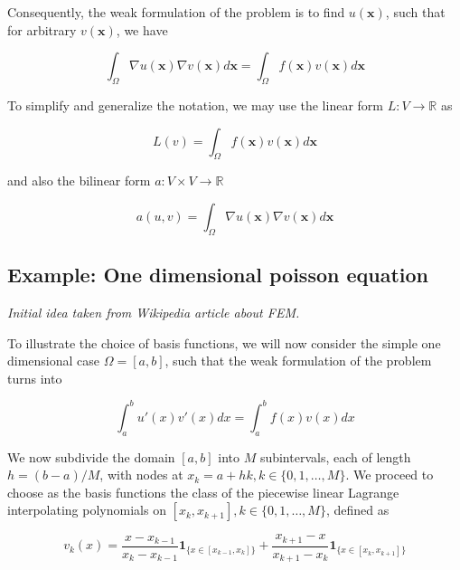 \documentclass[11pt, a4paper]{article}
\begin{document}
Consequently, the weak formulation of the problem is to find $u(\mathbf{x})$, such
that for arbitrary $v(\mathbf{x})$, we have

\begin{equation}
    \int_{\Omega} \nabla u(\mathbf{x}) \nabla v(\mathbf{x}) d\mathbf{x} = \int_{\Omega} f(\mathbf{x}) v(\mathbf{x}) d\mathbf{x}
\end{equation}

To simplify and generalize the notation, we may use the linear form $L:V \to \mathbb{R}$ as 

\begin{equation}
    L(v) = \int_{\Omega} f(\mathbf{x}) v(\mathbf{x}) d\mathbf{x}
\end{equation}

and also the bilinear form $a: V \times V \to \mathbb{R}$

\begin{equation}
    a(u, v) = \int_{\Omega} \nabla u(\mathbf{x}) \nabla v(\mathbf{x}) d\mathbf{x}
\end{equation}

\subsection{Example: One dimensional poisson equation}
\label{subsec:1dpoiss}

\textit{Initial idea taken from Wikipedia article about FEM.}

To illustrate the choice of basis functions, we will now consider the simple one 
dimensional case $\Omega = [a, b]$, such that the weak formulation of the problem
turns into 

\begin{equation}
    \int_a^b u'(x) v'(x) dx = \int_a^b f(x) v(x) dx
\end{equation}

We now subdivide the domain $[a, b]$ into $M$ subintervals, each of length
$h=(b - a)/M$, with nodes at $x_k = a + hk, k \in \{0, 1, \dots, M\}$. We
proceed to choose as the basis functions the class of the piecewise linear
Lagrange interpolating polynomials on $[x_k, x_{k+1}], k \in \{0, 1, \dots, M\}$,
defined as 

\begin{equation}
    v_k(x) = \frac{x-x_{k-1}}{x_{k}-x_{k-1}} \mathbf{1}_{\{x \in [x_{k-1}, x_k]\}} + 
            \frac{x_{k+1}-x}{x_{k+1}-x_k} \mathbf{1}_{\{x \in [x_k, x_{k+1}]\}}
\end{equation}
\end{document}
